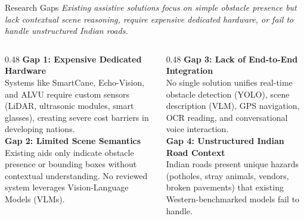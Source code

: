 \begin{frame}{Research Gaps}
{\normalsize\textit{Existing assistive solutions focus on simple obstacle presence but lack contextual scene reasoning, require expensive dedicated hardware, or fail to handle unstructured Indian roads.}}\\[10pt]

\begin{columns}[T]
  \begin{column}{0.48\textwidth}
    \textbf{\textcolor{MyUnivGreen}{Gap 1: Expensive Dedicated Hardware}}\\[2pt]
    Systems like SmartCane, Echo-Vision, and ALVU require custom sensors (LiDAR, ultrasonic modules, smart glasses), creating severe cost barriers in developing nations.\\[8pt]
    
    \textbf{\textcolor{MyUnivGreen}{Gap 2: Limited Scene Semantics}}\\[2pt]
    Existing aids only indicate obstacle presence or bounding boxes without contextual understanding. No reviewed system leverages Vision-Language Models (VLMs).
  \end{column}
  
  \begin{column}{0.48\textwidth}
    \textbf{\textcolor{MyUnivGreen}{Gap 3: Lack of End-to-End Integration}}\\[2pt]
    No single solution unifies real-time obstacle detection (YOLO), scene description (VLM), GPS navigation, OCR reading, and conversational voice interaction.\\[8pt]
    
    \textbf{\textcolor{MyUnivGreen}{Gap 4: Unstructured Indian Road Context}}\\[2pt]
    Indian roads present unique hazards (potholes, stray animals, vendors, broken pavements) that existing Western-benchmarked models fail to handle.
  \end{column}
\end{columns}
\end{frame}
